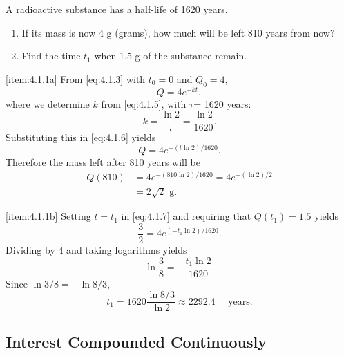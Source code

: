 \documentclass{ximera}
\begin{document}

\begin{example}\label{example:4.1.1}
A  radioactive substance has a half-life of 1620 years.
\begin{enumerate}
\item \label{item:4.1.1a}%
If its mass is now 4 g (grams), how much will be left 810 years
from now?
\item \label{item:4.1.1b}%
Find the time $t_1$ when 1.5 g of the substance remain.
\end{enumerate}
\begin{explanation}
\ref{item:4.1.1a}  From \eqref{eq:4.1.3} with $t_0=0$ and
$Q_0=4$,
\begin{equation} \label{eq:4.1.6}
Q=4e^{-kt},
\end{equation}
 where we determine $k$ from \eqref{eq:4.1.5}, with $\tau$=
1620 years:
$$
k=\frac{\ln2}{\tau}=\frac{\ln2}{1620}.
$$
 Substituting this in \eqref{eq:4.1.6} yields
\begin{equation} \label{eq:4.1.7}
Q=4e^{-(t\ln2)/1620}.
\end{equation}
 Therefore the mass left after 810 years will be
$$\begin{array}{rl}
Q(810) &=4e^{-(810\ln2)/1620}=4e^{-(\ln2)/2} \\
&=2\sqrt{2} \mbox{ g}.
\end{array}$$

\ref{item:4.1.1b}
 Setting $t=t_1$  in \eqref{eq:4.1.7} and requiring that
$Q(t_1)=1.5$ yields
$$
\frac{3}{2}=4e^{(-t_1\ln2)/1620}.
$$
Dividing by 4 and taking logarithms yields
$$
\ln\frac{3}{8}=-\frac{t_1\ln2}{1620}.
$$
Since $\ln3/8=-\ln8/3$,
$$
t_1=1620\frac{\ln8/3}{\ln2}\approx  2292.4\quad\mbox{ years}.
$$
\end{explanation}
\end{example}

\subsection*{Interest Compounded Continuously}
\end{document}
